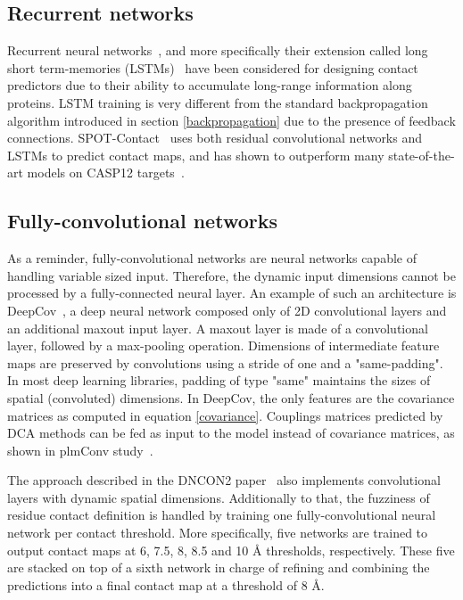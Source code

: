     \subsection{Recurrent networks}

        Recurrent neural networks~\cite{cleeremans1989finite}, and more specifically their
        extension called long short term-memories (LSTMs)~\cite{hochreiter1997long} have been considered
        for designing contact predictors due to their ability to accumulate long-range information
        along proteins. LSTM training is very different from the standard backpropagation algorithm
        introduced in section \ref{backpropagation} due to the presence of feedback connections.
        SPOT-Contact~\cite{hanson2018accurate} uses both residual convolutional networks
        and LSTMs to predict contact maps, and has shown to outperform many state-of-the-art
        models on CASP12 targets~\cite{moult2018critical}.

    \subsection{Fully-convolutional networks}

        As a reminder, fully-convolutional networks are neural networks capable
        of handling variable sized input. Therefore, the dynamic input dimensions
        cannot be processed by a fully-connected neural layer.
        An example of such an architecture is DeepCov~\cite{doi:10.1093/bioinformatics/bty341},
        a deep neural network composed only of 2D convolutional layers and an additional
        maxout input layer. A maxout layer is made of a convolutional layer, followed
        by a max-pooling operation. Dimensions of intermediate feature maps are preserved
        by convolutions using a stride of one and a "same-padding". In most deep learning
        libraries, padding of type "same"
        maintains the sizes of spatial (convoluted) dimensions.
        In DeepCov, the only features are the covariance matrices as computed
        in equation \ref{covariance}. Couplings matrices predicted by DCA methods can be fed as
        input to the model instead of covariance matrices, as shown in plmConv study~\cite{golkov2016protein}.

        The approach described in the DNCON2 paper~\cite{doi:10.1093/bioinformatics/bty341}
        also implements convolutional layers with dynamic spatial dimensions.
        Additionally to that, the fuzziness of residue contact definition is handled
        by training one fully-convolutional neural network per contact threshold.
        More specifically, five networks are trained to output contact maps at 6, 7.5, 8, 8.5 and 10 \AA{}
        thresholds, respectively. These five are stacked on top of a sixth network in charge
        of refining and combining the predictions into a final contact map at a threshold of 8 \AA{}.

